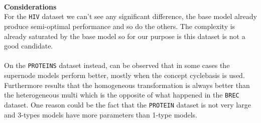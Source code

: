 \documentclass[twoside,11pt]{article}
\begin{document}
\noindent
{}\\
\noindent
{}\\\\

\noindent
\textbf{Considerations}\\
For the \texttt{HIV} dataset we can't see any significant difference, the base model already produce semi-optimal performance and so do the others. The complexity is already saturated by the base model so for our purpose is this dataset is not a good candidate.\\\\
On the \texttt{PROTEINS} dataset instead, can be observed that in some cases the supernode models perform better, mostly when the concept cyclebasis is used. Furthermore results that the homogeneous transformation is always better than the heterogeneous multi which is the opposite of what happened in the \texttt{BREC} dataset. One reason could be the fact that the \texttt{PROTEIN} dataset is not very large and 3-types models have more parameters than 1-type models.
\end{document}
